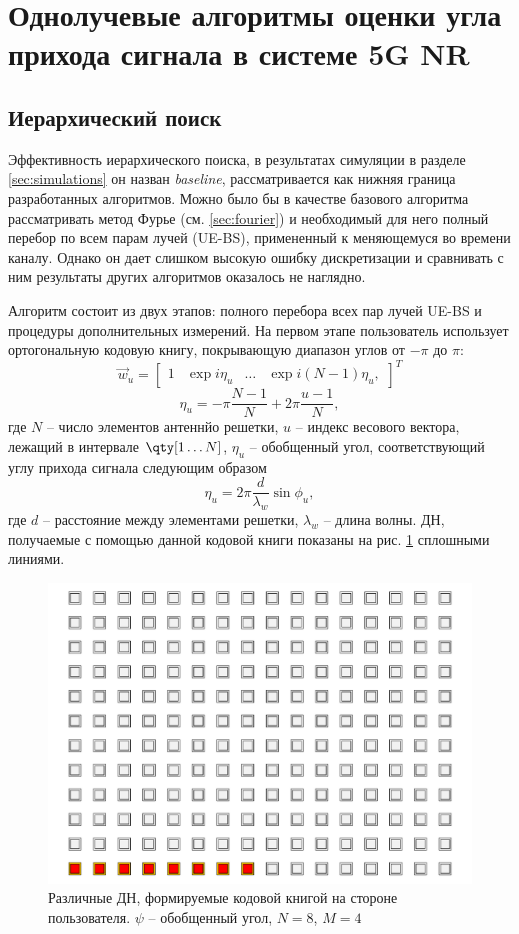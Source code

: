 \section{Однолучевые алгоритмы оценки угла прихода сигнала в системе 5G NR}
\label{sec:singlepath}
\subsection{Иерархический поиск}
Эффективность иерархического поиска, в результатах симуляции в разделе
\ref{sec:simulations} он назван \textit{baseline}, рассматривается как нижняя
граница разработанных алгоритмов.  Можно было бы в качестве базового алгоритма рассматривать
метод Фурье (см. \ref{sec:fourier}) и необходимый для него полный перебор
по всем парам лучей (UE-BS), примененный к меняющемуся во времени каналу.
Однако он дает слишком высокую ошибку дискретизации и сравнивать с ним
результаты других алгоритмов оказалось не наглядно.

Алгоритм состоит из двух этапов: полного перебора всех пар лучей UE-BS и
процедуры дополнительных измерений.
На первом этапе пользователь использует ортогональную кодовую книгу, покрывающую
диапазон углов от $-\pi$ до $\pi$:
\begin{equation}
    \vec w_u =
    \begin{bmatrix}
        1 & \exp {i \eta_u} & \dots & \exp{i(N-1)\eta_u},
    \end{bmatrix}^T
\end{equation}
\begin{equation}
    \eta_u = -\pi \frac{N-1}{N} + 2\pi \frac{u-1}{N},
\end{equation}
где $N$ -- число элементов антеннйо решетки, $u$ -- индекс весового вектора, лежащий в интервале $\qty[1 \dots N]$, $\eta_u$ -- обобщенный угол, соответствующий углу прихода сигнала следующим образом
\begin{equation}
    \eta_u = 2\pi \frac{d}{\lambda_w}\sin\phi_u,
\end{equation}
где $d$ -- расстояние между элементами решетки, $\lambda_w$ -- длина волны. ДН,
получаемые с помощью данной кодовой книги показаны на рис. \ref{fig:4.9}
сплошными линиями.
\begin{figure}[ht]
    \centering
    \includegraphics[width=0.5\linewidth]{figs/fig4.8}
    \caption{Различные ДН, формируемые кодовой книгой на стороне пользователя. $\psi$ -- обобщенный угол, $N=8$, $M=4$}
    \label{fig:4.9}
\end{figure}

